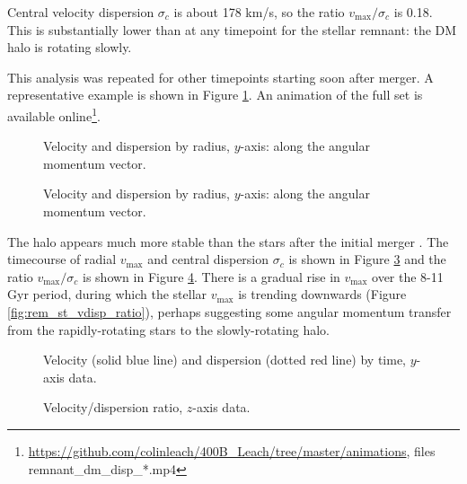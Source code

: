 \documentclass[twocolumn]{aastex63}
\newcommand{\todo}{\color{red}{TODO}\color{black}\hspace{2mm}}
\begin{document}

Central velocity dispersion $\sigma_c$ is about 178 km/s, so the ratio $v_{\text{max}} / \sigma_c$ is 0.18. This is substantially lower than at any timepoint for the stellar remnant: the DM halo is rotating slowly.

This analysis was repeated for other timepoints starting soon after merger. A representative example is shown in Figure \ref{fig:rem_dm_disp_y_450}. An animation of the full set is available online\footnote{\url{https://github.com/colinleach/400B_Leach/tree/master/animations}, files remnant\_dm\_disp\_*.mp4 }.

\begin{figure}[htb!]
	\caption{Velocity and dispersion by radius, $y$-axis: along the angular momentum vector.
		\label{fig:rem_dm_disp_y_450}}
\end{figure}

\begin{figure}[htb!]
	\caption{Velocity and dispersion by radius, $y$-axis: along the angular momentum vector.
		\label{fig:rem_dm_disp_y_600}}
\end{figure}

The halo appears much more stable than the stars after the initial merger \todo{ref to prediction}. The timecourse of radial $v_{\text{max}}$ and central dispersion $\sigma_c$ is shown in Figure \ref{fig:rem_dm_vdisp_tc} and the ratio $v_{\text{max}} / \sigma_c$ is shown in Figure \ref{fig:rem_dm_vdisp_ratio}. There is a gradual rise in $v_{\text{max}}$ over the 8-11 Gyr period, during which the stellar $v_{\text{max}}$ is trending downwards (Figure \ref{fig:rem_st_vdisp_ratio}), perhaps suggesting some angular momentum transfer from the rapidly-rotating stars to the slowly-rotating halo.

\begin{figure}[htb!]
	\caption{Velocity (solid blue line) and dispersion (dotted red line) by time, $y$-axis data.
		\label{fig:rem_dm_vdisp_tc}}
\end{figure}


\begin{figure}[htb!]
	\caption{Velocity/dispersion ratio, $z$-axis data.
		\label{fig:rem_dm_vdisp_ratio}}
\end{figure}
\end{document}
